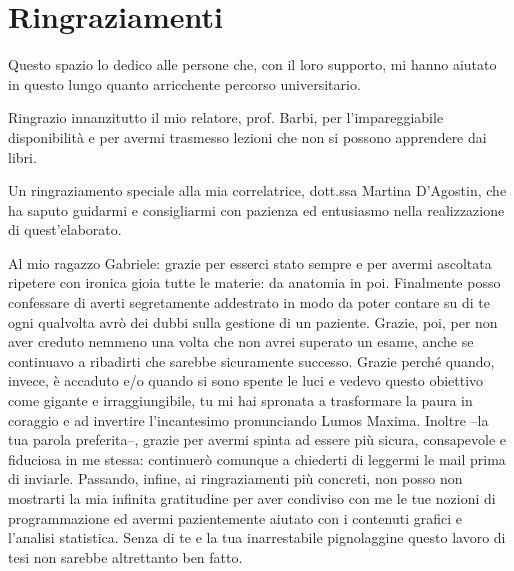 \setcounter{secnumdepth}{-1}
\chapter{Ringraziamenti}

Questo spazio lo dedico alle persone che, con il loro supporto, mi hanno aiutato in questo lungo quanto arricchente percorso universitario. 

\bigskip \noindent
Ringrazio innanzitutto il mio relatore, prof. Barbi, per l'impareggiabile disponibilità e per avermi trasmesso lezioni che non si possono apprendere dai libri.

\bigskip \noindent
Un ringraziamento speciale alla mia correlatrice, dott.ssa Martina D'Agostin, che ha saputo guidarmi e consigliarmi con pazienza ed entusiasmo nella realizzazione di quest'elaborato. %

\bigskip \noindent
Al mio ragazzo Gabriele: grazie per esserci stato sempre e per avermi ascoltata ripetere con ironica gioia tutte le materie: da anatomia in poi. Finalmente posso confessare di averti segretamente addestrato in modo da poter contare su di te ogni qualvolta avrò dei dubbi sulla gestione di un paziente. Grazie, poi, per non aver creduto nemmeno una volta che non avrei superato un esame, anche se continuavo a ribadirti che sarebbe sicuramente successo. Grazie perché quando, invece, è accaduto e/o quando si sono spente le luci e vedevo questo obiettivo come gigante e irraggiungibile, tu mi hai spronata a trasformare la paura in coraggio e ad invertire l'incantesimo pronunciando Lumos Maxima. Inoltre --la tua parola preferita--, grazie per avermi spinta ad essere più sicura, consapevole e fiduciosa in me stessa: continuerò comunque a chiederti di leggermi le mail prima di inviarle. Passando, infine, ai ringraziamenti più concreti, non posso non mostrarti la mia infinita gratitudine per aver condiviso con me le tue nozioni di programmazione ed avermi pazientemente aiutato con i contenuti grafici e l'analisi statistica. Senza di te e la tua inarrestabile pignolaggine questo lavoro di tesi non sarebbe altrettanto ben fatto. 


